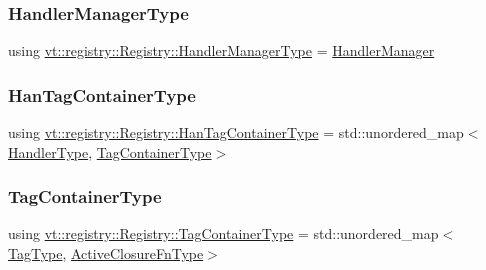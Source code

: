 \mbox{\label{structvt_1_1registry_1_1_registry_a0717ad6519a3d2c6f3e1848182db4bfa}} 
\subsubsection{\texorpdfstring{Handler\+Manager\+Type}{HandlerManagerType}}
{\footnotesize\ttfamily using \hyperlink{structvt_1_1registry_1_1_registry_a0717ad6519a3d2c6f3e1848182db4bfa}{vt\+::registry\+::\+Registry\+::\+Handler\+Manager\+Type} =  \hyperlink{structvt_1_1_handler_manager}{Handler\+Manager}}

\mbox{\label{structvt_1_1registry_1_1_registry_ab5d336044aee749d39c8feabe4fa6983}} 
\subsubsection{\texorpdfstring{Han\+Tag\+Container\+Type}{HanTagContainerType}}
{\footnotesize\ttfamily using \hyperlink{structvt_1_1registry_1_1_registry_ab5d336044aee749d39c8feabe4fa6983}{vt\+::registry\+::\+Registry\+::\+Han\+Tag\+Container\+Type} =  std\+::unordered\+\_\+map$<$\hyperlink{namespacevt_af64846b57dfcaf104da3ef6967917573}{Handler\+Type}, \hyperlink{structvt_1_1registry_1_1_registry_abefc9cdcc8557c5d547dd3ae44ae0996}{Tag\+Container\+Type}$>$}

\mbox{\label{structvt_1_1registry_1_1_registry_abefc9cdcc8557c5d547dd3ae44ae0996}} 
\subsubsection{\texorpdfstring{Tag\+Container\+Type}{TagContainerType}}
{\footnotesize\ttfamily using \hyperlink{structvt_1_1registry_1_1_registry_abefc9cdcc8557c5d547dd3ae44ae0996}{vt\+::registry\+::\+Registry\+::\+Tag\+Container\+Type} =  std\+::unordered\+\_\+map$<$\hyperlink{namespacevt_a84ab281dae04a52a4b243d6bf62d0e52}{Tag\+Type}, \hyperlink{namespacevt_a2a06c34cafcd511828f16cbf1476b924}{Active\+Closure\+Fn\+Type}$>$}


